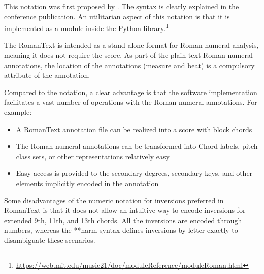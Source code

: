 

This notation was first proposed by
\textcite{gotham2019romantext}. The syntax is clearly
explained in the conference publication. An utilitarian
aspect of this notation is that it is implemented as a
module inside the  Python
library.\footnote{\href{https://web.mit.edu/music21/doc/moduleReference/moduleRoman.html}{https://web.mit.edu/music21/doc/moduleReference/moduleRoman.html}}


The RomanText is intended as a stand-alone format for Roman
numeral analysis, meaning it does not require the score. As
part of the plain-text Roman numeral annotations, the
location of the annotations (measure and beat) is a
compulsory attribute of the annotation.

Compared to the  notation, a clear advantage is
that the software implementation facilitates a vast number
of operations with the Roman numeral annotations. For
example:

\begin{itemize}
    \item A RomanText annotation file can be realized into a
    score with block chords
    \item The Roman numeral annotations can be transformed
    into Chord labels, pitch class sets, or other
    representations relatively easy
    \item Easy access is provided to the secondary degrees,
    secondary keys, and other elements implicitly encoded in
    the annotation
\end{itemize}

Some disadvantages of the numeric notation for inversions
preferred in RomanText is that it does not allow an
intuitive way to encode inversions for extended 9th, 11th,
and 13th chords. All the inversions are encoded through
numbers, whereas the **harm syntax defines inversions by
letter exactly to disambiguate these scenarios.
